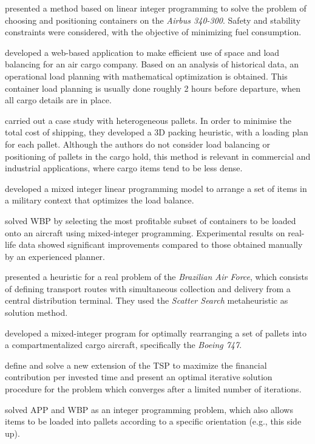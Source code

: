 \documentclass[preprint,authoryear]{elsarticle}
\begin{document}
\cite{MongeauBes2003} presented a method based on linear integer programming to solve the problem of choosing and positioning containers on the {\it Airbus 340-300}. Safety and stability constraints were considered, with the objective of minimizing fuel consumption.

\cite{fok2004optimizing} developed a web-based application to make efficient use of space and load balancing for an air cargo company. Based on an analysis of historical data, an operational load planning with mathematical optimization is obtained. This container load planning is usually done roughly 2 hours before departure, when all cargo details are in place.

\cite{Chan2006} carried out a case study with heterogeneous pallets. In order to minimise the total cost of shipping, they developed a 3D packing heuristic, with a loading plan for each pallet. Although the authors do not consider load balancing or positioning of pallets in the cargo hold, this method is relevant in commercial and industrial applications, where cargo items tend to be less dense.

\cite{KaluznyBohdanL2009Oalb} developed a mixed integer linear programming model to arrange a set of items in a military context that optimizes the load balance.

\cite{Verstichel2011} solved WBP by selecting the most profitable subset of containers to be loaded onto an aircraft using mixed-integer programming. Experimental results on real-life data showed significant improvements compared to those obtained manually by an experienced planner.

\cite{MesquitaCunha2011} presented a heuristic for a real problem of the {\it Brazilian Air Force}, which consists of defining transport routes with simultaneous collection and delivery from a central distribution terminal. They used the {\it Scatter Search} metaheuristic as solution method.

\cite{Limbourg2012} developed a mixed-integer program for optimally rearranging a set of pallets into a compartmentalized cargo aircraft, specifically the {\it Boeing 747}.

\cite{kaspi2019} define and solve a new extension of the TSP to maximize the financial contribution per invested time and present an optimal iterative solution procedure for the problem which converges after a limited number of iterations.

\cite{RoesenerHall2014} solved APP and WBP as an integer programming problem, which also allows items to be loaded into pallets according to a specific orientation (e.g., this side up).
\end{document}
